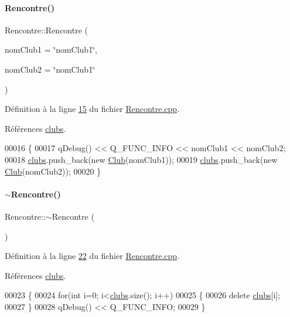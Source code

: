 \paragraph{\texorpdfstring{Rencontre()}{Rencontre()}}
{\footnotesize\ttfamily Rencontre\+::\+Rencontre (\begin{DoxyParamCaption}\item[{Q\+String}]{nom\+Club1 = {\ttfamily \char`\"{}nomClub1\char`\"{}},  }\item[{Q\+String}]{nom\+Club2 = {\ttfamily \char`\"{}nomClub1\char`\"{}} }\end{DoxyParamCaption})}



Définition à la ligne \hyperlink{_rencontre_8cpp_source_l00015}{15} du fichier \hyperlink{_rencontre_8cpp_source}{Rencontre.\+cpp}.



Références \hyperlink{_rencontre_8h_source_l00030}{clubs}.


\begin{DoxyCode}
00016 \{
00017     qDebug() << Q\_FUNC\_INFO << nomClub1 << nomClub2;
00018     \hyperlink{class_rencontre_a12f6cef62070ecb095971e704a9d92a6}{clubs}.push\_back(\textcolor{keyword}{new} \hyperlink{class_club}{Club}(nomClub1));
00019     \hyperlink{class_rencontre_a12f6cef62070ecb095971e704a9d92a6}{clubs}.push\_back(\textcolor{keyword}{new} \hyperlink{class_club}{Club}(nomClub2));
00020 \}
\end{DoxyCode}
\mbox{\label{class_rencontre_a437de7d5f9adced5124dcfdd13e504d3}} 
\paragraph{\texorpdfstring{$\sim$\+Rencontre()}{~Rencontre()}}
{\footnotesize\ttfamily Rencontre\+::$\sim$\+Rencontre (\begin{DoxyParamCaption}{ }\end{DoxyParamCaption})}



Définition à la ligne \hyperlink{_rencontre_8cpp_source_l00022}{22} du fichier \hyperlink{_rencontre_8cpp_source}{Rencontre.\+cpp}.



Références \hyperlink{_rencontre_8h_source_l00030}{clubs}.


\begin{DoxyCode}
00023 \{
00024     \textcolor{keywordflow}{for}(\textcolor{keywordtype}{int} i=0; i<\hyperlink{class_rencontre_a12f6cef62070ecb095971e704a9d92a6}{clubs}.size(); i++)
00025     \{
00026         \textcolor{keyword}{delete} \hyperlink{class_rencontre_a12f6cef62070ecb095971e704a9d92a6}{clubs}[i];
00027     \}
00028     qDebug() << Q\_FUNC\_INFO;
00029 \}
\end{DoxyCode}



